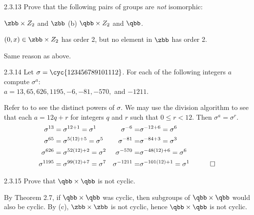 \begin{exercise}{2.3.13}
    Prove that the following pairs of groups are \emph{not} isomorphic:
    \begin{subexercises}
        \item $\zbb \times Z_2$ and $\zbb$ \quad (b) $\qbb \times Z_2$ and $\qbb$.
    \end{subexercises}
\end{exercise}

\begin{solenum}
    \item $(0, x) \in \zbb \times Z_2$ has order 2, but no element in $\zbb$ has order 2.
    \item Same reason as above. 
\end{solenum}

\begin{exercise}{2.3.14}
    Let $\sigma = \cyc{1 2 3 4 5 6 7 8 9 10 11 12}$.
	For each of the following integers $a$ compute $\sigma^a$: 
    \\ $a = 13, 65, 626, 1195, -6, -81, -570,$ and $-1211$.
\end{exercise}

\begin{sol}
    Refer to  to see the distinct powers of $\sigma$.
	We may use the division algorithm to see that each $a = 12q + r$ for integers $q$ and $r$ such that $0 \leq r < 12$.
	Then $\sigma^a = \sigma^r$.
    \begin{align*}
        && \sigma^{13} & = \sigma^{12 + 1} = \sigma^1 & \sigma^{-6} = & \sigma^{-12 + 6} = \sigma^6 \\
        && \sigma^{65} & = \sigma^{5(12) + 5} = \sigma^5 & \sigma^{-81} = & \sigma^{-84 + 3} = \sigma^3 \\
        && \sigma^{626} & = \sigma^{52(12) + 2} = \sigma^2 & \sigma^{-570} = & \sigma^{-48(12) + 6} = \sigma^6 \\
        && \sigma^{1195} & = \sigma^{99(12) + 7} = \sigma^7 & \sigma^{-1211} = & \sigma^{-101(12) + 1} = \sigma^1 && \qedhere
    \end{align*}
\end{sol}

\begin{exercise}{2.3.15}
    Prove that $\qbb \times \qbb$ is not cyclic.
\end{exercise}

\begin{sol}
    By Theorem 2.7, if $\qbb \times \qbb$ was cyclic, then subgroups of $\qbb \times \qbb$ would also be cyclic. By  (c), $\zbb \times \zbb$ is not cyclic, hence $\qbb \times \qbb$ is not cyclic.
\end{sol}

